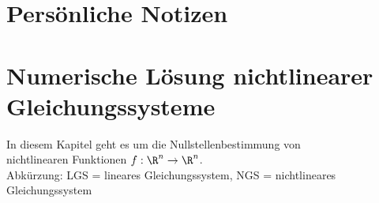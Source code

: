 \section{Persönliche Notizen}

\section{Numerische Lösung nichtlinearer Gleichungssysteme}

\begin{remark}
    In diesem Kapitel geht es um die Nullstellenbestimmung von\\ nichtlinearen Funktionen $f: \R^n \to \R^n$. \\
    Abkürzung: LGS = lineares Gleichungssystem, NGS = nichtlineares Gleichungssystem
\end{remark}


